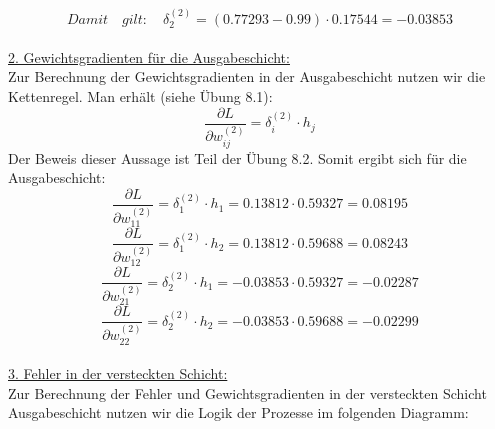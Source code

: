 \documentclass[12pt]{article}
\begin{document}
\[
Damit \quad gilt: \quad \delta^{(2)}_2 = (0.77293 - 0.99) \cdot 0.17544 = -0.03853
\]\\
%
\underline{2. Gewichtsgradienten für die Ausgabeschicht:}\\[0.2cm]
Zur Berechnung der Gewichtsgradienten in der Ausgabeschicht nutzen wir die Kettenregel. Man erhält (siehe Übung 8.1): \\ 
\[ \frac{\partial L}{\partial w^{(2)}_{ij}} = \delta^{(2)}_i \cdot h_j \]
%
Der Beweis dieser Aussage ist Teil der Übung 8.2. Somit ergibt sich für die Ausgabeschicht:\\ 
\[
\frac{\partial L}{\partial w^{(2)}_{11}} = \delta^{(2)}_1 \cdot h_1 = 0.13812 \cdot 0.59327 = 0.08195
\]
\[
\frac{\partial L}{\partial w^{(2)}_{12}} = \delta^{(2)}_1 \cdot h_2 = 0.13812 \cdot 0.59688 = 0.08243
\]
\[
\frac{\partial L}{\partial w^{(2)}_{21}} = \delta^{(2)}_2 \cdot h_1 = -0.03853 \cdot 0.59327 = -0.02287
\]
\[
\frac{\partial L}{\partial w^{(2)}_{22}} = \delta^{(2)}_2 \cdot h_2 = -0.03853 \cdot 0.59688 = -0.02299
\]\\
%
\underline{3. Fehler in der versteckten Schicht:}\\[0.2cm]
Zur Berechnung der Fehler und Gewichtsgradienten in der versteckten Schicht Ausgabeschicht nutzen wir die Logik der Prozesse im folgenden Diagramm: \\[6.5cm]
\end{document}
